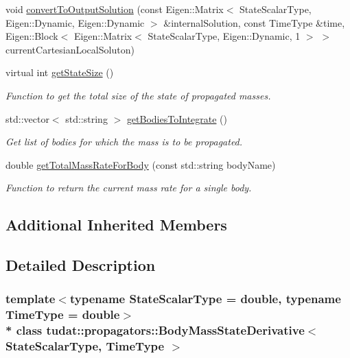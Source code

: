 \begin{DoxyCompactItemize}
\item 
void \hyperlink{classtudat_1_1propagators_1_1BodyMassStateDerivative_a70a988ff5e71b00f9b5c99a39921507e}{convert\+To\+Output\+Solution} (const Eigen\+::\+Matrix$<$ State\+Scalar\+Type, Eigen\+::\+Dynamic, Eigen\+::\+Dynamic $>$ \&internal\+Solution, const Time\+Type \&time, Eigen\+::\+Block$<$ Eigen\+::\+Matrix$<$ State\+Scalar\+Type, Eigen\+::\+Dynamic, 1 $>$ $>$ current\+Cartesian\+Local\+Soluton)
\item 
virtual int \hyperlink{classtudat_1_1propagators_1_1BodyMassStateDerivative_ae12d2a506db4676be1c59b9058e8dae7}{get\+State\+Size} ()
\begin{DoxyCompactList}\small\item\em Function to get the total size of the state of propagated masses. \end{DoxyCompactList}\item 
std\+::vector$<$ std\+::string $>$ \hyperlink{classtudat_1_1propagators_1_1BodyMassStateDerivative_a532cb9a49fb9507b5d829a2301cd20a8}{get\+Bodies\+To\+Integrate} ()
\begin{DoxyCompactList}\small\item\em Get list of bodies for which the mass is to be propagated. \end{DoxyCompactList}\item 
double \hyperlink{classtudat_1_1propagators_1_1BodyMassStateDerivative_a08b3e8d1ea2902b23f930f7f140c3b2f}{get\+Total\+Mass\+Rate\+For\+Body} (const std\+::string body\+Name)
\begin{DoxyCompactList}\small\item\em Function to return the current mass rate for a single body. \end{DoxyCompactList}\end{DoxyCompactItemize}
\subsection*{Additional Inherited Members}


\subsection{Detailed Description}
\subsubsection*{template$<$typename State\+Scalar\+Type = double, typename Time\+Type = double$>$\\*
class tudat\+::propagators\+::\+Body\+Mass\+State\+Derivative$<$ State\+Scalar\+Type, Time\+Type $>$}

